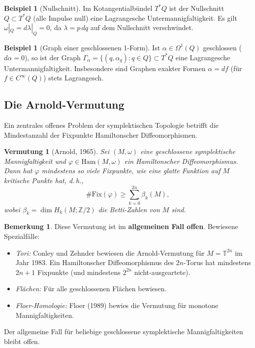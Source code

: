 \documentclass[12pt,a4paper]{amsart}
\newtheorem{vermutung}[theorem]{Vermutung}
\theoremstyle{definition}
\newtheorem{beispiel}[theorem]{Beispiel}
\newtheorem{bemerkung}[theorem]{Bemerkung}
\begin{document}
\begin{beispiel}[Nullschnitt]
Im Kotangentialbündel $T^*Q$ ist der Nullschnitt $Q \subset T^*Q$ (alle
Impulse null) eine Lagrangesche Untermannigfaltigkeit.  Es gilt
$\omega|_Q = d\lambda|_Q = 0$, da $\lambda = p\,dq$ auf dem Nullschnitt
verschwindet.
\end{beispiel}

\begin{beispiel}[Graph einer geschlossenen 1-Form]
Ist $\alpha \in \Omega^1(Q)$ geschlossen ($d\alpha = 0$), so ist der Graph
$\Gamma_\alpha = \{(q, \alpha_q) : q \in Q\} \subset T^*Q$
eine Lagrangesche Untermannigfaltigkeit.  Insbesondere sind Graphen exakter
Formen $\alpha = df$ (für $f \in C^\infty(Q)$) stets Lagrangesch.
\end{beispiel}

\subsection{Die Arnold-Vermutung}

Ein zentrales offenes Problem der symplektischen Topologie betrifft die
Mindestanzahl der Fixpunkte Hamiltonscher Diffeomorphismen.

\begin{vermutung}[Arnold, 1965]\label{conj:arnold}
Sei $(M, \omega)$ eine geschlossene symplektische Mannigfaltigkeit und
$\varphi \in \mathrm{Ham}(M, \omega)$ ein Hamiltonscher Diffeomorphismus.
Dann hat $\varphi$ mindestens so viele Fixpunkte, wie eine glatte Funktion
auf $M$ kritische Punkte hat, d.\,h.,
\[
  \#\mathrm{Fix}(\varphi) \geq \sum_{k=0}^{2n} \beta_k(M),
\]
wobei $\beta_k = \dim H_k(M; \mathbb{Z}/2)$ die Betti-Zahlen von $M$ sind.
\end{vermutung}

\begin{bemerkung}
Diese Vermutung ist im \textbf{allgemeinen Fall offen}.  Bewiesene Spezialfälle:
\begin{itemize}
  \item \textit{Tori:} Conley und Zehnder bewiesen die Arnold-Vermutung für
    $M = \mathbb{T}^{2n}$ im Jahr 1983.  Ein Hamiltonscher Diffeomorphismus
    des $2n$-Torus hat mindestens $2n+1$ Fixpunkte (und mindestens $2^{2n}$
    nicht-ausgeartete).
  \item \textit{Flächen:} Für alle geschlossenen Flächen bewiesen.
  \item \textit{Floer-Homologie:} Floer (1989) bewies die Vermutung für
    monotone Mannigfaltigkeiten.
\end{itemize}
Der allgemeine Fall für beliebige geschlossene symplektische Mannigfaltigkeiten
bleibt offen.
\end{bemerkung}
\end{document}
